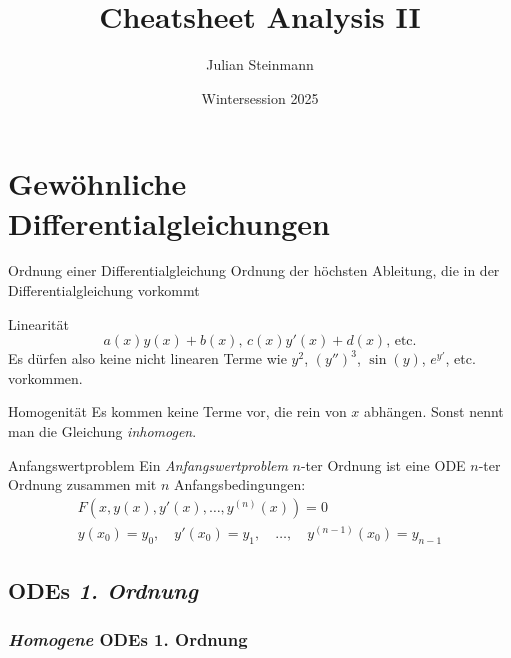 \documentclass[a4paper,10pt]{article}
\title{Cheatsheet Analysis II}
\author{Julian Steinmann}
\date{Wintersession 2025}
\begin{document}

% 

\small


\section{Gewöhnliche Differentialgleichungen}

\begin{subbox}{Ordnung einer Differentialgleichung}
    Ordnung der höchsten Ableitung, die in der Differentialgleichung vorkommt
\end{subbox}

\begin{subbox}{Linearität}
    \[
        a(x)y(x) + b(x) \text{, } c(x)y'(x) + d(x) \text{, etc.}
    \]
    Es dürfen also keine nicht linearen Terme wie \( y^2 \), \( (y'')^3 \), \( \sin(y) \), \( e^{y'} \), etc. vorkommen.
\end{subbox}

\begin{subbox}{Homogenität}
    Es kommen keine Terme vor, die rein von \( x \) abhängen. Sonst nennt man die Gleichung \emph{inhomogen}.
\end{subbox}

\begin{mainbox}{Anfangswertproblem}
    Ein \emph{Anfangswertproblem} \( n \)-ter Ordnung ist eine ODE \( n \)-ter Ordnung zusammen mit \( n \) Anfangsbedingungen:
    \[
        \begin{array}{l}
            F(x, y(x), y'(x), \dots, y^{(n)}(x)) = 0 \\
            y(x_0) = y_0, \quad
            y'(x_0) = y_1, \quad
            \dots, \quad
            y^{(n - 1)}(x_0) = y_{n - 1}
        \end{array}
    \]
\end{mainbox}


\subsection{ODEs \emph{1. Ordnung}}

\subsubsection{\emph{Homogene} ODEs 1. Ordnung}
\end{document}
